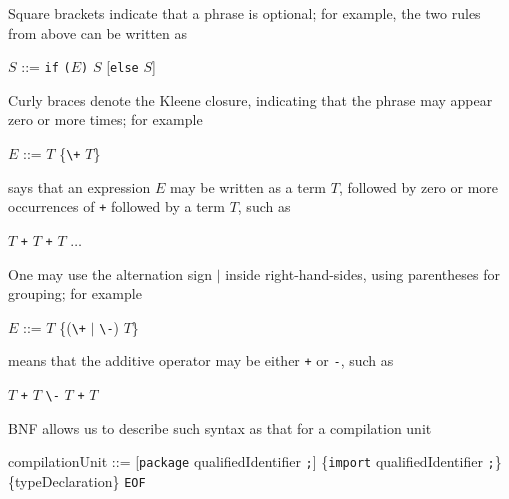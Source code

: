 \documentclass[8pt,a4paper,compress]{beamer}
\newcommand{\mm}[1]{$#1$}
\begin{document}
\begin{frame}[fragile]
\pause

Square brackets indicate that a phrase is optional; for example, the two rules from above can be written as

\begin{production}
\mm{S} ::=  \lstinline{if} \lstinline{(}\mm{E}\lstinline{)} \mm{S} [\lstinline{else} \mm{S}]
\end{production}

\pause

Curly braces denote the Kleene closure, indicating that the phrase may appear zero or more times; for example

\begin{production}
\mm{E} ::= \mm{T} \{\lstinline{\+} \mm{T}\}
\end{production}

\noindent says that an expression $E$ may be written as a term $T$, followed by zero or more  occurrences of \lstinline{+} followed by a term $T$, such as

\begin{production}
\mm{T} \lstinline{+} \mm{T} \lstinline{+} \mm{T} \mm{\dots}
\end{production}

\pause

One may use the alternation sign $|$ inside right-hand-sides, using parentheses for grouping; for example

\begin{production}
\mm{E} ::= \mm{T} \{(\lstinline{\+} \mm{|} \lstinline{\-}) \mm{T}\}
\end{production}

\noindent means that the additive operator may be either \lstinline{+} or \lstinline{-}, such as

\begin{production}
\mm{T} \lstinline{+} \mm{T} \lstinline{\-} \mm{T} \lstinline{+} \mm{T}
\end{production}

\pause

BNF allows us to describe such syntax as that for a \jmm compilation unit

\begin{production}
compilationUnit ::= [\lstinline{package} qualifiedIdentifier \lstinline{;}]
                           \{\lstinline{import}  qualifiedIdentifier \lstinline{;}\}
                           \{typeDeclaration\} \lstinline{EOF}
\end{production}
\end{frame}
\end{document}
